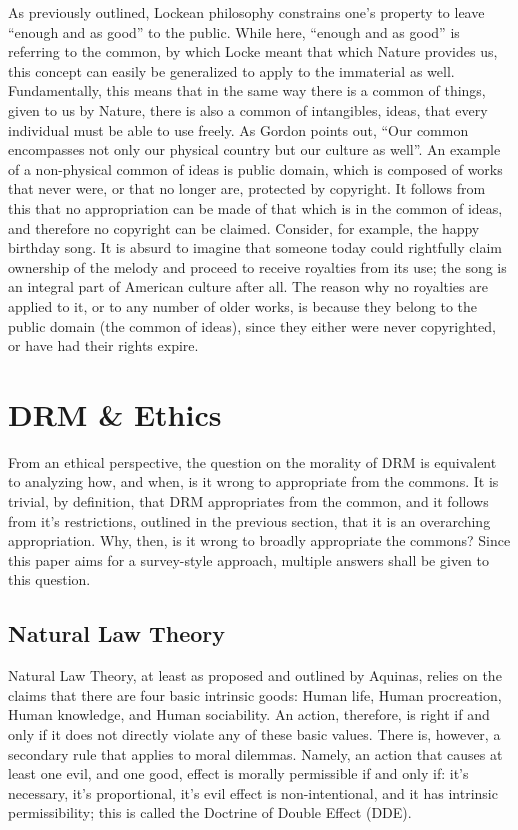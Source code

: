\documentclass[12pt,letterpaper]{article}
\begin{document}
As previously outlined, Lockean philosophy constrains one's property to leave ``enough and as good''\autocite[\pno~291]{locke-1988} to the public. While here, ``enough and as good'' is referring to the common, by which Locke meant that which Nature provides us, this concept can easily be generalized to apply to the immaterial as well. Fundamentally, this means that in the same way there is a common of things, given to us by Nature, there is also a common of intangibles, ideas, that every individual must be able to use freely. As Gordon points out, ``Our common encompasses not only our physical country but our culture as well''\autocite[\pno~1555]{gordon-1993}. An example of a non-physical common of ideas is public domain, which is composed of works that never were, or that no longer are, protected by copyright. It follows from this that no appropriation can be made of that which is in the common of ideas, and therefore no copyright can be claimed. Consider, for example, the happy birthday song. It is absurd to imagine that someone today could rightfully claim ownership of the melody and proceed to receive royalties from its use; the song is an integral part of American culture after all. The reason why no royalties are applied to it, or to any number of older works, is because they belong to the public domain (the common of ideas), since they either were never copyrighted, or have had their rights expire.

\section{DRM \& Ethics}
From an ethical perspective, the question on the morality of DRM is equivalent to analyzing how, and when, is it wrong to appropriate from the commons. It is trivial, by definition, that DRM appropriates from the common, and it follows from it's restrictions, outlined in the previous section, that it is an overarching appropriation. Why, then, is it wrong to broadly appropriate the commons? Since this paper aims for a survey-style approach, multiple answers shall be given to this question.

\subsection{Natural Law Theory}
Natural Law Theory, at least as proposed and outlined by Aquinas, relies on the claims that there are four basic intrinsic goods: Human life, Human procreation, Human knowledge, and Human sociability.
An action, therefore, is right if and only if it does not directly violate any of these basic values. There is, however, a secondary rule that applies to moral dilemmas. Namely, an action that causes at least one evil, and one good, effect is morally permissible if and only if: it's necessary, it's proportional, it's evil effect is non-intentional, and it has intrinsic permissibility; this is called the Doctrine of Double Effect (DDE).
\end{document}

